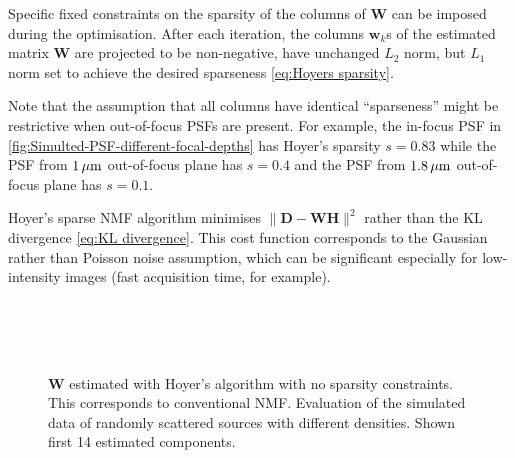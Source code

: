 Specific fixed constraints on the sparsity of the columns of $\bm{W}$ can be imposed during the optimisation. After each iteration, the columns $\bm{w}_k$s of the estimated matrix $\bm{W}$ are projected to be non-negative, have unchanged $L_2$ norm, but $L_1$ norm set to achieve the desired sparseness \autoref{eq:Hoyers sparsity}.

Note that the assumption that all columns have identical ``sparseness'' might be restrictive when out-of-focus PSFs are present. For example, the in-focus PSF in \autoref{fig:Simulted-PSF-different-focal-depths} has Hoyer's sparsity $s=0.83$ while the PSF from $1 \, \mathrm{\mu m}$ out-of-focus plane has $s=0.4$ and the PSF from $1.8 \, \mathrm{\mu m}$ out-of-focus plane  has $s=0.1$.

Hoyer's sparse NMF algorithm minimises $\|\bm{D} - \bm{WH}\|^2$ rather than the KL divergence \autoref{eq:KL divergence}. This cost function corresponds to the Gaussian rather than Poisson noise assumption, which can be significant especially for low-intensity images (fast acquisition time, for example). 

\begin{figure}[!tb] %
	\newcommand{\sizefig}{.9}
	\centering
	\\
	\\
	\\	
	\caption{$\bm{W}$ estimated with Hoyer's algorithm with no sparsity constraints. This corresponds to conventional NMF. Evaluation of the simulated data of randomly scattered sources with different densities. Shown first 14 estimated components.}
	\label{fig: Hoyer no sparsity constraint}
\end{figure}

